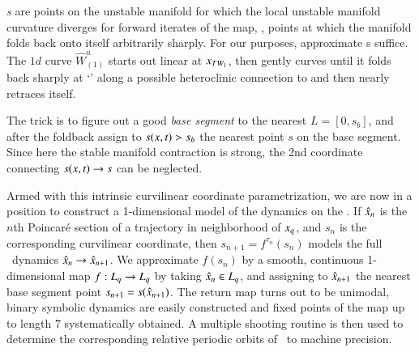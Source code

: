 {\em \Turn s} are points on the unstable
manifold for which the local unstable manifold curvature diverges
for forward iterates of the map, \ie, points at which the manifold
folds back onto itself arbitrarily sharply.
For our purposes,
approximate \turn s suffice.
The $1d$ curve $\hat{W}^u_{(1)}$ starts out linear at
$x_{TW_{1}}$, then gently curves until it folds back sharply
at `\turn' along a possible heteroclinic connection to 
and then nearly retraces itself.

The trick is to figure out a good {\em base segment} to the
nearest {\turn} $L=[0,s_{b}]$, and after the foldback assign
to $s(x,t)>s_{b}$ the nearest point $s$ on the base
segment. Since here the stable manifold contraction is strong, the
2nd coordinate connecting $s(x,t) \to s$ can be neglected.

Armed with this intrinsic curvilinear coordinate
parametrization, we are now in a position to construct a
1-dimensional model of the dynamics on the \nws. If
$\hat{x}_n$ is the $n$th Poincar\'e section of a
trajectory in neighborhood of $x_q$, and $s_n$ is the
corresponding curvilinear coordinate, then $s_{n+1} = f^{\tau_n}(s_n)$
models the full \statesp\ dynamics $\hat{x}_n \to
\hat{x}_{n+1}$. We approximate $f(s_n)$ by a smooth,
continuous 1-dimensional map $f : L_q \to L_q$ by taking
$\hat{x}_n \in L_q$, and assigning to
$\hat{x}_{n+1}$ the nearest base segment point
$s_{n+1}=s(\hat{x}_{n+1})$. The return map turns out to
be unimodal, binary symbolic dynamics are easily constructed
and fixed points of the map up to length
$7$ systematically obtained. A multiple shooting routine is then
used to determine the corresponding relative periodic orbits of
\cLe\ to machine precision.


